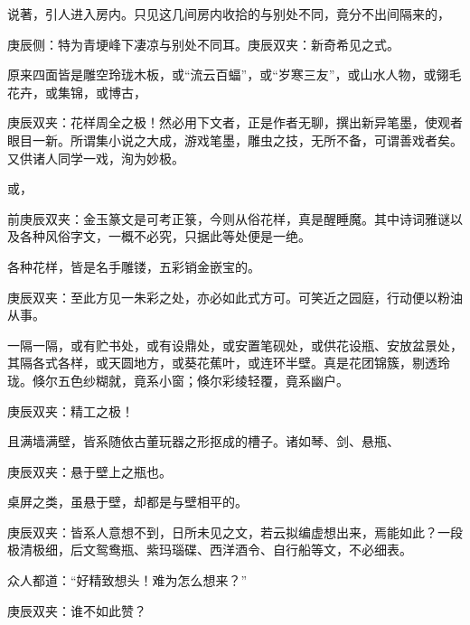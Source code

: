 \begin{parag}
    说著，引人进入房内。只见这几间房内收拾的与别处不同，竟分不出间隔来的，\begin{note}庚辰侧：特为青埂峰下凄凉与别处不同耳。庚辰双夹：新奇希见之式。\end{note}原来四面皆是雕空玲珑木板，或“流云百蝠”，或“岁寒三友”，或山水人物，或翎毛花卉，或集锦，或博古，\begin{note}庚辰双夹：花样周全之极！然必用下文者，正是作者无聊，撰出新异笔墨，使观者眼目一新。所谓集小说之大成，游戏笔墨，雕虫之技，无所不备，可谓善戏者矣。又供诸人同学一戏，洵为妙极。\end{note}或，\begin{note}前庚辰双夹：金玉篆文是可考正箓，今则从俗花样，真是醒睡魔。其中诗词雅谜以及各种风俗字文，一概不必究，只据此等处便是一绝。\end{note}各种花样，皆是名手雕镂，五彩销金嵌宝的。\begin{note}庚辰双夹：至此方见一朱彩之处，亦必如此式方可。可笑近之园庭，行动便以粉油从事。\end{note}一隔一隔，或有贮书处，或有设鼎处，或安置笔砚处，或供花设瓶、安放盆景处，其隔各式各样，或天圆地方，或葵花蕉叶，或连环半壁。真是花团锦簇，剔透玲珑。倏尔五色纱糊就，竟系小窗；倏尔彩绫轻覆，竟系幽户。\begin{note}庚辰双夹：精工之极！\end{note}且满墙满壁，皆系随依古董玩器之形抠成的槽子。诸如琴、剑、悬瓶、\begin{note}庚辰双夹：悬于壁上之瓶也。\end{note}桌屏之类，虽悬于壁，却都是与壁相平的。\begin{note}庚辰双夹：皆系人意想不到，日所未见之文，若云拟编虚想出来，焉能如此？一段极清极细，后文鸳鸯瓶、紫玛瑙碟、西洋酒令、自行船等文，不必细表。\end{note}众人都道：“好精致想头！难为怎么想来？”\begin{note}庚辰双夹：谁不如此赞？\end{note}
\end{parag}


